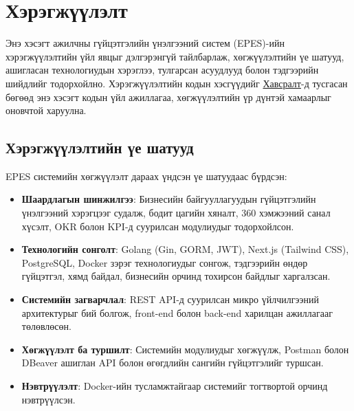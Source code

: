 \section{Хэрэгжүүлэлт}
Энэ хэсэгт ажилчны гүйцэтгэлийн үнэлгээний систем (EPES)-ийн хэрэгжүүлэлтийн үйл явцыг дэлгэрэнгүй тайлбарлаж, хөгжүүлэлтийн үе шатууд, ашигласан технологиудын хэрэглээ, 
тулгарсан асуудлууд болон тэдгээрийн шийдлийг тодорхойлно. Хэрэгжүүлэлтийн кодын хэсгүүдийг \hyperref[sec:appendix]{Хавсралт}-д тусгасан бөгөөд энэ хэсэгт кодын үйл ажиллагаа, 
хөгжүүлэлтийн үр дүнтэй хамаарлыг оновчтой харуулна.

\subsection{Хэрэгжүүлэлтийн үе шатууд}
EPES системийн хөгжүүлэлт дараах үндсэн үе шатуудаас бүрдсэн:
\begin{itemize}
    \item \textbf{Шаардлагын шинжилгээ}: Бизнесийн байгууллагуудын гүйцэтгэлийн үнэлгээний хэрэгцээг судалж, бодит цагийн хяналт, 360 хэмжээний санал хүсэлт, OKR болон 
    KPI-д суурилсан модулиудыг тодорхойлсон.
    \item \textbf{Технологийн сонголт}: Golang (Gin, GORM, JWT), Next.js (Tailwind CSS), PostgreSQL, Docker зэрэг технологиудыг сонгож, тэдгээрийн өндөр гүйцэтгэл, 
    хямд байдал, бизнесийн орчинд тохирсон байдлыг харгалзсан.
    \item \textbf{Системийн загварчлал}: REST API-д суурилсан микро үйлчилгээний архитектурыг бий болгож, front-end болон back-end харилцан ажиллагааг төлөвлөсөн.
    \item \textbf{Хөгжүүлэлт ба туршилт}: Системийн модулиудыг хөгжүүлж, Postman болон DBeaver ашиглан API болон өгөгдлийн сангийн гүйцэтгэлийг туршсан.
    \item \textbf{Нэвтрүүлэлт}: Docker-ийн тусламжтайгаар системийг тогтвортой орчинд нэвтрүүлсэн.
\end{itemize}

